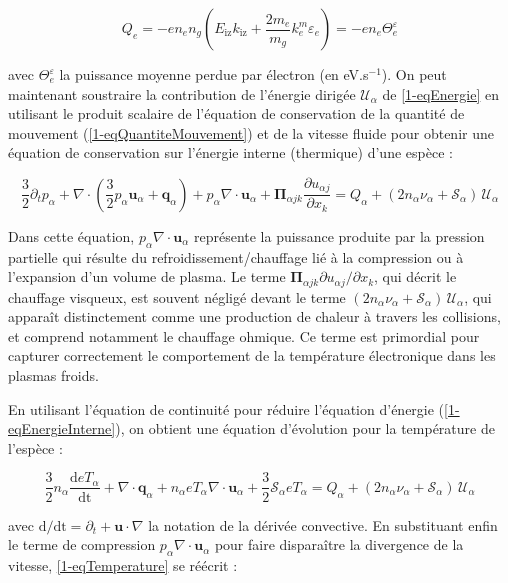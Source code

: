 \begin{refsection}
\begin{equation}
	Q_e=-en_en_g\left(E_\text{iz}k_\text{iz}+\frac{2m_e}{m_g}k^m_e\varepsilon_e\right)=-en_e\Theta_e^\varepsilon
\end{equation}

avec $\Theta_e^\varepsilon$ la puissance moyenne perdue par électron (en
eV.s$^{-1}$). On peut maintenant soustraire la contribution de l'énergie
dirigée $\mathcal{U}_{\alpha}$ de \eqref{1-eqEnergie} en utilisant le produit
scalaire de l'équation de conservation de la quantité de mouvement
(\eqref{1-eqQuantiteMouvement}) et de la vitesse fluide pour obtenir une
équation de conservation sur l'énergie interne (thermique) d'une espèce :

\begin{equation}
\label{1-eqEnergieInterne}
\frac{3}{2}\partial_t p_\alpha + 
\nabla\cdot\left(\frac{3}{2}p_\alpha
\mathbf{u}_\alpha+\mathbf q_\alpha\right)+p_\alpha\nabla\cdot\mathbf u_\alpha
+\boldsymbol{\Pi}_{\alpha j k}\frac{\partial u_{\alpha j}}{\partial{x_k}} =
{Q_\alpha}+(2n_\alpha\nu_\alpha+\mathcal{S}_\alpha)\,\mathcal{U}_\alpha
\end{equation}

Dans cette équation, $p_\alpha\nabla\cdot\mathbf u_\alpha$ représente la
puissance produite par la pression partielle qui résulte du
refroidissement/chauffage lié à la compression ou à l'expansion d'un volume de
plasma. Le terme $\boldsymbol{\Pi}_{\alpha j k}\partial u_{\alpha
j}/\partial{x_k}$, qui décrit le chauffage visqueux, est souvent négligé
devant le terme $(2n_\alpha\nu_\alpha+\mathcal{S}_\alpha)\,\mathcal{U}_\alpha$, 
qui apparaît distinctement comme une production de chaleur
à travers les collisions, et comprend notamment le chauffage ohmique. Ce
 terme est primordial pour capturer correctement le comportement de la
température électronique dans les plasmas froids.

En utilisant l'équation de
continuité pour réduire l'équation d'énergie (\eqref{1-eqEnergieInterne}), on
obtient une équation d'évolution pour la température de l'espèce :

\begin{equation}
\label{1-eqTemperature}
\frac{3}{2}n_\alpha\frac{\text{d}eT_\alpha}{\text{dt}}+\nabla\cdot\mathbf
q_\alpha + n_\alpha eT_\alpha\nabla\cdot\mathbf u_\alpha +
\frac{3}{2}\mathcal{S}_\alpha eT_\alpha =
{Q_\alpha}+(2n_\alpha\nu_\alpha+\mathcal{S}_\alpha)\,\mathcal{U}_\alpha
\end{equation}

avec $\text{d}/\text{dt}=\partial_t+\mathbf u\cdot\nabla$ la notation de la
dérivée convective. En substituant enfin le terme de compression
$p_\alpha\nabla\cdot\mathbf u_\alpha$ pour faire disparaître la divergence de la
vitesse, \eqref{1-eqTemperature} se réécrit :


\end{refsection}
